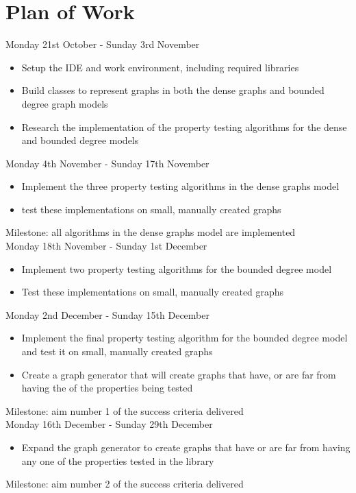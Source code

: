 \documentclass[11pt,a4paper]{article}
\begin{document}
\section{Plan of Work}
Monday 21st October - Sunday 3rd November
\begin{itemize}
    \item Setup the IDE and work environment, including required libraries
    \item Build classes to represent graphs in both the dense graphs and bounded degree graph models
    \item Research the implementation of the property testing algorithms for the dense and bounded degree models
\end{itemize}
Monday 4th November - Sunday 17th November
\begin{itemize}
    \item Implement the three property testing algorithms in the dense graphs model
    \item test these implementations on small, manually created graphs
\end{itemize}
Milestone:  all algorithms in the dense graphs model are implemented \\
Monday 18th November - Sunday 1st December
\begin{itemize}
    \item Implement two property testing algorithms for the bounded degree model
    \item Test these implementations on small, manually created graphs
\end{itemize}
Monday 2nd December - Sunday 15th December
\begin{itemize}
    \item Implement the final property testing algorithm for the bounded degree model and test it on small, manually created graphs
    \item Create a graph generator that will create graphs that have, or are far from having the of the properties being tested
\end{itemize}
Milestone: aim number 1 of the success criteria delivered \\
Monday 16th December - Sunday 29th December
\begin{itemize}
    \item Expand the graph generator to create graphs that have or are far from having any one of the properties tested in the library
\end{itemize}
Milestone: aim number 2 of the success criteria delivered \\
\end{document}
